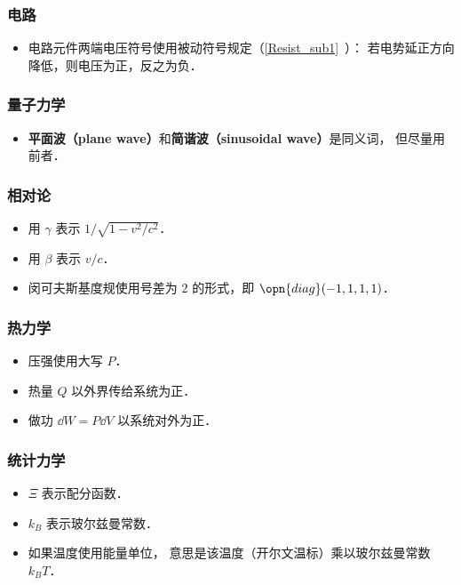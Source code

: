 \subsubsection{电路}
\begin{itemize}
\item 电路元件两端电压符号使用被动符号规定（\autoref{Resist_sub1}~）： 若电势延正方向降低，则电压为正，反之为负．
\end{itemize}

\subsubsection{量子力学}
\begin{itemize}
\item \textbf{平面波（plane wave）}和\textbf{简谐波（sinusoidal wave）}是同义词， 但尽量用前者．
\end{itemize}

\subsubsection{相对论}
\begin{itemize}
\item 用 $\gamma$ 表示 $1/\sqrt{1 - v^2/c^2}$．
\item 用 $\beta$ 表示 $v/c$．
\item 闵可夫斯基度规使用号差为 $2$ 的形式，即 $\opn{diag}(-1, 1, 1, 1)$．
\end{itemize}

\subsubsection{热力学}
\begin{itemize}
\item 压强使用大写 $P$．
\item 热量 $Q$ 以外界传给系统为正．
\item 做功 $\dd{W} = P\dd{V}$ 以系统对外为正．
\end{itemize}

\subsubsection{统计力学}
\begin{itemize}
\item $\Xi$ 表示配分函数．
\item $k_B$ 表示玻尔兹曼常数．
\item 如果温度使用能量单位， 意思是该温度（开尔文温标）乘以玻尔兹曼常数 $k_B T$．
\end{itemize}

